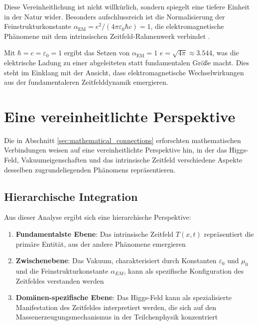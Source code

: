 \documentclass[12pt,a4paper]{article}
\newcommand{\Tfieldt}{T(x,t)}
\newcommand{\alphaEM}{\alpha_{\text{EM}}}
\begin{document}
	Diese Vereinheitlichung ist nicht willkürlich, sondern spiegelt eine tiefere Einheit in der Natur wider. Besonders aufschlussreich ist die Normalisierung der Feinstrukturkonstante $\alphaEM = e^2/(4\pi\varepsilon_0\hbar c) = 1$, die elektromagnetische Phänomene mit dem intrinsischen Zeitfeld-Rahmenwerk verbindet \cite{pascher_alpha_2025}.
	
	Mit $\hbar = c = \varepsilon_0 = 1$ ergibt das Setzen von $\alphaEM = 1$ $e = \sqrt{4\pi} \approx 3.544$, was die elektrische Ladung zu einer abgeleiteten statt fundamentalen Größe macht. Dies steht im Einklang mit der Ansicht, dass elektromagnetische Wechselwirkungen aus der fundamentaleren Zeitfelddynamik emergieren.
	
	\section{Eine vereinheitlichte Perspektive}
	\label{sec:unified_perspective}
	
	Die in Abschnitt \ref{sec:mathematical_connections} erforschten mathematischen Verbindungen weisen auf eine vereinheitlichte Perspektive hin, in der das Higgs-Feld, Vakuumeigenschaften und das intrinsische Zeitfeld verschiedene Aspekte desselben zugrundeliegenden Phänomens repräsentieren.
	
	\subsection{Hierarchische Integration}
	\label{subsec:hierarchical_integration}
	
	Aus dieser Analyse ergibt sich eine hierarchische Perspektive:
	
	\begin{enumerate}
		\item \textbf{Fundamentalste Ebene}: Das intrinsische Zeitfeld $\Tfieldt$ repräsentiert die primäre Entität, aus der andere Phänomene emergieren
		
		\item \textbf{Zwischenebene}: Das Vakuum, charakterisiert durch Konstanten $\varepsilon_0$ und $\mu_0$ und die Feinstrukturkonstante $\alpha_{EM}$, kann als spezifische Konfiguration des Zeitfeldes verstanden werden
		
		\item \textbf{Domänen-spezifische Ebene}: Das Higgs-Feld kann als spezialisierte Manifestation des Zeitfeldes interpretiert werden, die sich auf den Massenerzeugungsmechanismus in der Teilchenphysik konzentriert
	\end{enumerate}
	
\end{document}
